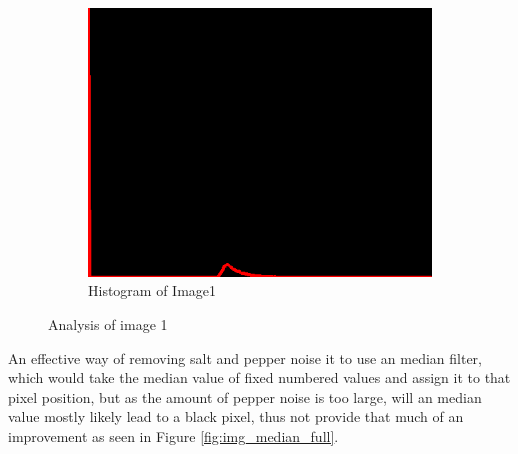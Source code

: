 \begin{figure}[H]
\begin{subfigure}[b]{0.446\textwidth}
        \includegraphics[width=\textwidth]{img1/src_hist1.png}
        \caption{Histogram of Image1 \\[0.45cm]}
        \label{fig:img1_hist}
    \end{subfigure}
    \caption{Analysis of image 1}\label{fig:img1}
\end{figure}

An effective way of removing salt and pepper noise it to use an median filter, which would take the median value  of fixed numbered  values and assign it to that pixel position, but as the amount of pepper noise is too large, will an median value mostly likely lead to a black pixel, thus not provide that much of an improvement as seen in Figure \ref{fig:img_median_full}.  


